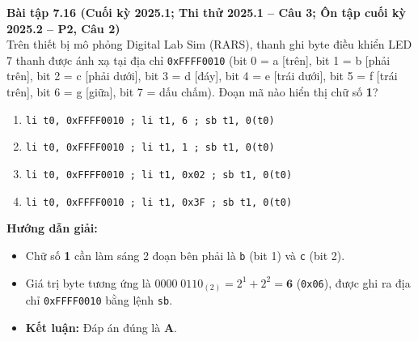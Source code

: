 \textbf{Bài tập 7.16 (Cuối kỳ 2025.1; Thi thử 2025.1 -- Câu 3; Ôn tập cuối kỳ 2025.2 -- P2, Câu 2)}\\
Trên thiết bị mô phỏng Digital Lab Sim (RARS), thanh ghi byte điều khiển LED 7 thanh được ánh xạ tại địa chỉ \texttt{0xFFFF0010} (bit 0 = a [trên], bit 1 = b [phải trên], bit 2 = c [phải dưới], bit 3 = d [đáy], bit 4 = e [trái dưới], bit 5 = f [trái trên], bit 6 = g [giữa], bit 7 = dấu chấm). Đoạn mã nào hiển thị chữ số \textbf{1}?
\begin{enumerate}[label=\Alph*.]
    \item \texttt{li t0, 0xFFFF0010 ; li t1, 6 ; sb t1, 0(t0)}
    \item \texttt{li t0, 0xFFFF0010 ; li t1, 1 ; sb t1, 0(t0)}
    \item \texttt{li t0, 0xFFFF0010 ; li t1, 0x02 ; sb t1, 0(t0)}
    \item \texttt{li t0, 0xFFFF0010 ; li t1, 0x3F ; sb t1, 0(t0)}
\end{enumerate}
\textbf{Hướng dẫn giải:}
\begin{itemize}
    \item Chữ số \textbf{1} cần làm sáng 2 đoạn bên phải là \texttt{b} (bit 1) và \texttt{c} (bit 2).
    \item Giá trị byte tương ứng là $0000\;0110_{(2)} = 2^1 + 2^2 = \mathbf{6}$ (\texttt{0x06}), được ghi ra địa chỉ \texttt{0xFFFF0010} bằng lệnh \texttt{sb}.
    \item \textbf{Kết luận:} Đáp án đúng là \textbf{A}.
\end{itemize}

